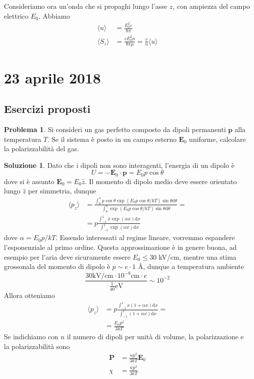 \documentclass[a4paper,11pt]{book}
\renewcommand{\d}{\mathrm{d}}
\renewcommand{\vec}[1]{\mathbf{#1}}
\theoremstyle{theorem}
\theoremstyle{definition}
\newtheorem{problema}{Problema}[section]
\newtheorem{soluzione}{Soluzione}[section]
\begin{document}
\noindent Consideriamo ora un'onda che si propaghi lungo l'asse $z$, con ampiezza del campo elettrico $E_0$. Abbiamo
\begin{align*}
\langle u\rangle&=\frac{E_0^2\varepsilon}{8\pi}\\
\langle S_z\rangle&=\frac{cE_0^2n}{8\pi\mu}=\frac{c}{n}\langle u\rangle
\end{align*}
\newpage
\section{23 aprile 2018}
\subsection{Esercizi proposti}
\begin{problema}
	Si consideri un gas perfetto composto da dipoli permanenti $\vec{p}$ alla temperatura $T$. Se il sistema è posto in un campo esterno $\vec{E}_0$ uniforme, calcolare la polarizzabilità del gas.
\end{problema}
\begin{soluzione}
	Dato che i dipoli non sono interagenti, l'energia di un dipolo è
	\[U=-\vec{E}_0\cdot\vec{p}=E_0p\cos\theta\]
	dove si è assunto $\vec{E}_0=E_0\hat{z}$. Il momento di dipolo medio deve essere orientato lungo $\hat{z}$ per simmetria, dunque 
	\begin{align*}\langle p_z\rangle&=\frac{\int_{0}^{\pi}p\cos\theta \exp\left(E_0p\cos\theta/kT\right)\sin\theta\d\theta}{\int_{0}^{\pi} \exp\left(E_0p\cos\theta/kT\right)\sin\theta\d\theta}=\\&=p\frac{\int_{-1}^{1}x\exp(\alpha x)\d x}{\int_{-1}^{1}\exp(\alpha x)\d x}\end{align*}
	dove $\alpha=E_0p/kT$. Essendo interessati al regime lineare, vorremmo espandere l'esponenziale al primo ordine. Questa approssimazione è in genere buona, ad esempio per l'aria deve sicuramente essere $E_0\leq 30$ kV/cm, mentre una stima grossonala del momento di dipolo è $p\sim e\cdot 1$ \AA, dunque a temperatura ambiente
	\[\frac{30\mathrm{ kV/cm}\cdot 10^{-8}\mathrm{ cm}\cdot e}{\frac{1}{40}\mathrm{ eV}}\sim10^{-2}\]
	Allora otteniamo
	\begin{align*}\langle p_z\rangle&=p\frac{\int_{-1}^{1}x(1+\alpha x)\d x}{\int_{-1}^{1}(1+\alpha x)\d x}=\\&=\frac{E_0p^2}{3kT}\end{align*}
	Se indichiamo con $n$ il numero di dipoli per unità di volume, la polarizzazione e la polarizzabilità sono
	\begin{align*}
		\vec{P}&=\frac{np^2}{3kT}\vec{E}_0\\\chi&=\frac{np^2}{3kT}
	\end{align*}
\end{soluzione}
\end{document}
